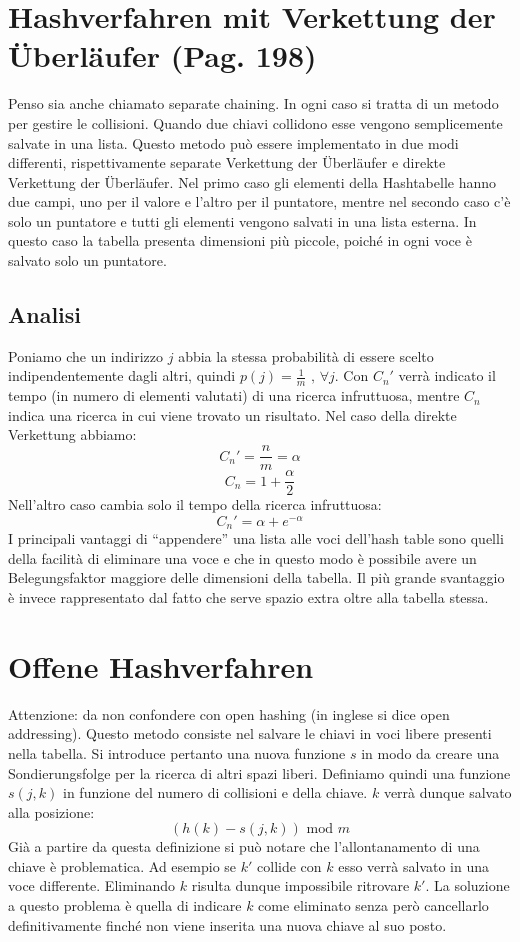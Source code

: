 \documentclass[a4paper]{book}
\begin{document}
\section{Hashverfahren mit Verkettung der Überläufer (Pag. 198)}
Penso sia anche chiamato separate chaining. In ogni caso si tratta di un metodo per gestire le collisioni. Quando due chiavi collidono esse vengono semplicemente salvate in una lista. Questo metodo può essere implementato in due modi differenti, rispettivamente separate Verkettung der Überläufer e direkte Verkettung der Überläufer. Nel primo caso gli elementi della Hashtabelle hanno due campi, uno per il valore e l'altro per il puntatore, mentre nel secondo caso c'è solo un puntatore e tutti gli elementi vengono salvati in una lista esterna. In questo caso la tabella presenta dimensioni più piccole, poiché in ogni voce è salvato solo un puntatore.
\subsection*{Analisi}
Poniamo che un indirizzo $j$ abbia la stessa probabilità di essere scelto indipendentemente dagli altri, quindi $p(j)=\frac{1}{m} \mbox{ , } \forall j$. Con $C_n'$ verrà indicato il tempo (in numero di elementi valutati) di una ricerca infruttuosa, mentre $C_n$ indica una ricerca in cui viene trovato un risultato. Nel caso della direkte Verkettung abbiamo:
$$ C_n '=\frac{n}{m}=\alpha $$
$$ C_n = 1+\frac{\alpha}{2} $$
Nell'altro caso cambia solo il tempo della ricerca infruttuosa:
$$C_n '=\alpha + e^{-\alpha} $$
I principali vantaggi di ``appendere'' una lista alle voci dell'hash table sono quelli della facilità di eliminare una voce e che in questo modo è possibile avere un Belegungsfaktor maggiore delle dimensioni della tabella. Il più grande svantaggio è invece rappresentato dal fatto che serve spazio extra oltre alla tabella stessa.
\section{Offene Hashverfahren}
Attenzione: da non confondere con open hashing (in inglese si dice open addressing). Questo metodo consiste nel salvare le chiavi in voci libere presenti nella tabella. Si introduce pertanto una nuova funzione $s$ in modo da creare una Sondierungsfolge per la ricerca di altri spazi liberi. Definiamo quindi una funzione $s(j,k)$ in funzione del numero di collisioni e della chiave. $k$ verrà dunque salvato alla posizione:
$$(h(k)-s(j,k))\mbox{ mod }m$$
Già a partire da questa definizione si può notare che l'allontanamento di una chiave è problematica. Ad esempio se $k'$ collide con $k$ esso verrà salvato in una voce differente. Eliminando $k$ risulta dunque impossibile ritrovare $k'$. La soluzione a questo problema è quella di indicare $k$ come eliminato senza però cancellarlo definitivamente finché non viene inserita una nuova chiave al suo posto.
\end{document}
